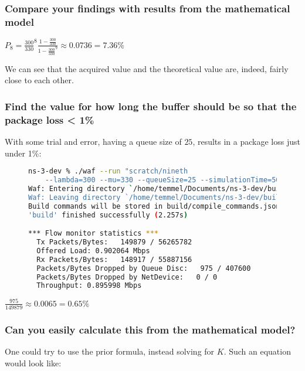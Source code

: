 \documentclass[a4paper, titlepage,12pt]{article}
\begin{document}
			\subsubsection*{Compare your findings with results from the mathematical model}

				\begin{center}
					$P_{8}=\frac{300}{330}^{8}\frac{1-\frac{300}{330}}{1-\frac{300}{330}^{9}} \approx 0.0736 = 7.36\%$
				\end{center}

				We can see that the acquired value and the theoretical value are, indeed, fairly close to each other.
			
			\subsubsection*{Find the value for how long the buffer should be so that the package loss < 1\%}
				
				With some trial and error, having a queue size of $25$, results in a package loss just under 1\%:

				\begin{figure}[h!]
					\begin{lstlisting}[language=sh]
ns-3-dev % ./waf --run "scratch/nineth
	--lambda=300 --mu=330 --queueSize=25 --simulationTime=500"
Waf: Entering directory `/home/temmel/Documents/ns-3-dev/build'
Waf: Leaving directory `/home/temmel/Documents/ns-3-dev/build'
Build commands will be stored in build/compile_commands.json
'build' finished successfully (2.257s)

*** Flow monitor statistics ***
  Tx Packets/Bytes:   149879 / 56265782
  Offered Load: 0.902064 Mbps
  Rx Packets/Bytes:   148917 / 55887156
  Packets/Bytes Dropped by Queue Disc:   975 / 407600
  Packets/Bytes Dropped by NetDevice:   0 / 0
  Throughput: 0.895998 Mbps
					\end{lstlisting}

				\end{figure}
					\begin{center}
						$\frac{975}{149879} \approx 0.0065 = 0.65\%$
					\end{center}

			\subsubsection*{Can you easily calculate this from the mathematical model?}
				
				One could try to use the prior formula, instead solving for $K$. Such an equation would look like:
\end{document}
